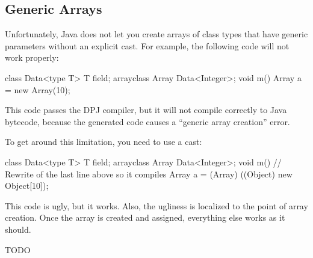 \subsection{Generic Arrays}

Unfortunately, Java does not let you create arrays of class types that
have generic parameters without an explicit cast.  For example, the
following code will not work properly:
%
\begin{dpjlisting}
class Data<type T> {
  T field;
  arrayclass Array {
    Data<Integer>;
  }
  void m() {
    Array a = new Array(10);
  }
}
\end{dpjlisting}
%
This code passes the DPJ compiler, but it will not compile correctly
to Java bytecode, because the generated code causes a ``generic array
creation'' error.

To get around this limitation, you need to use a cast:
%
\begin{dpjlisting}
class Data<type T> {
  T field;
  arrayclass Array {
    Data<Integer>;
  }
  void m() {
    // Rewrite of the last line above so it compiles
    Array a = (Array) ((Object) new Object[10]);
  }
}
\end{dpjlisting}
%
This code is ugly, but it works.  Also, the ugliness is localized to
the point of array creation.  Once the array is created and assigned,
everything else works as it should.

TODO
